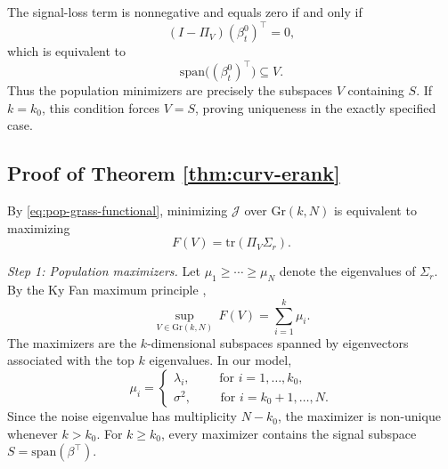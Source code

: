 \documentclass[11pt,letterpaper]{article}
\newcommand{\gr}{\mathrm{Gr}}
\newcommand{\tr}{\mathrm{tr}}
\newcommand{\cJ}{\mathcal{J}}
\begin{document}
The signal-loss term is nonnegative and equals zero if and only if
\begin{equation*}
(I-\Pi_V)(\beta_t^0)^\top=0,
\end{equation*}
which is equivalent to
\begin{equation*}
\mathrm{span}\big((\beta_t^0)^\top\big)\subseteq V.
\end{equation*}
Thus the population minimizers are precisely the subspaces $V$ containing $S$. If $k=k_0$, this condition forces $V=S$, proving uniqueness in the exactly specified case.


\subsection{Proof of Theorem \ref{thm:curv-erank}}

By \eqref{eq:pop-grass-functional}, minimizing $\cJ$ over $\gr(k,N)$ is equivalent to maximizing
\begin{equation*}
F(V)=\tr(\Pi_V\Sigma_r).
\end{equation*}

\smallskip
\noindent
\emph{Step 1: Population maximizers.}
Let $\mu_1\geq\cdots\geq\mu_N$ denote the eigenvalues of $\Sigma_r$. By the Ky Fan maximum principle \cite{B97},
\begin{equation}
\label{eq:ky-fan}
\sup_{V\in\gr(k,N)}\,F(V)=\sum_{i=1}^k \mu_i.
\end{equation}
The maximizers are the $k$-dimensional subspaces spanned by eigenvectors associated with the top $k$ eigenvalues. In our model,
\begin{equation*}
\mu_i=
\begin{cases}
\lambda_i,\qquad\text{ for } i=1,\ldots, k_0,\\
\sigma^2,\qquad\text{ for } i=k_0+1,\ldots, N.
\end{cases}
\end{equation*}
Since the noise eigenvalue has multiplicity $N-k_0$, the maximizer is non-unique whenever $k>k_0$. For $k\geq k_0$, every maximizer contains the signal subspace $S=\mathrm{span}(\beta^\top)$.
\end{document}
